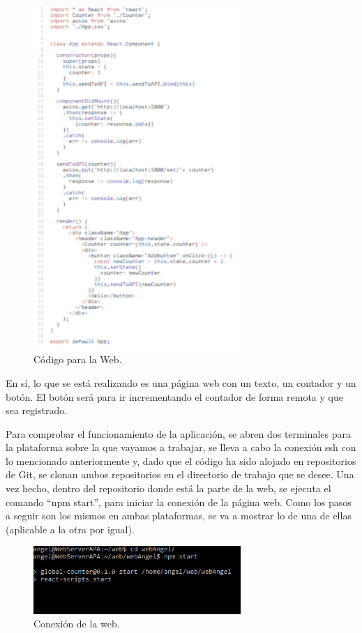 \documentclass[english,runningheads,a4paper]{llncs}[2018/03/10]
\begin{document}
\begin{figure}[H]
 \centering
 \includegraphics[width=0.7\textwidth]{./Web/Azure/CodigoWeb1.png}
 \caption{Código para la Web.}
\end{figure}

En sí, lo que se está realizando es una página web con un texto, un contador y un
botón. El botón será para ir incrementando el contador de forma remota y que sea
registrado.

Para comprobar el funcionamiento de la aplicación, se abren dos terminales para la
plataforma sobre la que vayamos a trabajar, se lleva a cabo la conexión ssh con lo
mencionado anteriormente y, dado que el código ha sido alojado en repositorios de
Git, se clonan ambos repositorios en el directorio de trabajo que se desee. Una vez
hecho, dentro del repositorio donde está la parte de la web, se ejecuta el comando
“npm start”, para iniciar la conexión de la página web. Como los pasos a seguir son
los mismos en ambas plataformas, se va a mostrar lo de una de ellas (aplicable a la
otra por igual).

\begin{figure}[H]
 \centering
 \includegraphics[width=0.7\textwidth]{./Web/Azure/ConexionWeb.png}
 \caption{Conexión de la web.}
\end{figure}
\end{document}

